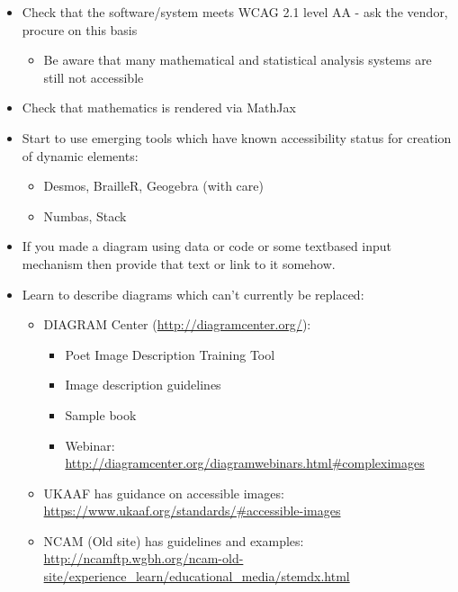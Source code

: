 \documentclass[
  12pt,
  a4paper]{extarticle}
\providecommand{\tightlist}{%
  \setlength{\itemsep}{0pt}\setlength{\parskip}{0pt}}
\renewcommand{\;}{\,}
\begin{document}
\begin{itemize}
\tightlist
\item
  Check that the software/system meets WCAG 2.1 level AA - ask the vendor, procure on this basis

  \begin{itemize}
  \tightlist
  \item
    Be aware that many mathematical and statistical analysis systems are still not accessible
  \end{itemize}
\item
  Check that mathematics is rendered via MathJax
\item
  Start to use emerging tools which have known accessibility status for creation of dynamic elements:

  \begin{itemize}
  \tightlist
  \item
    Desmos, BrailleR, Geogebra (with care)
  \item
    Numbas, Stack
  \end{itemize}
\item
  If you made a diagram using data or code or some textbased input mechanism then provide that text or link to it somehow.
\item
  Learn to describe diagrams which can't currently be replaced:

  \begin{itemize}
  \tightlist
  \item
    DIAGRAM Center (\url{http://diagramcenter.org/}):

    \begin{itemize}
    \tightlist
    \item
      Poet Image Description Training Tool
    \item
      Image description guidelines
    \item
      Sample book
    \item
      Webinar: \url{http://diagramcenter.org/diagramwebinars.html\#compleximages}
    \end{itemize}
  \item
    UKAAF has guidance on accessible images: \url{https://www.ukaaf.org/standards/\#accessible-images}
  \item
    NCAM (Old site) has guidelines and examples: \url{http://ncamftp.wgbh.org/ncam-old-site/experience_learn/educational_media/stemdx.html}
  \end{itemize}
\end{itemize}
\end{document}
